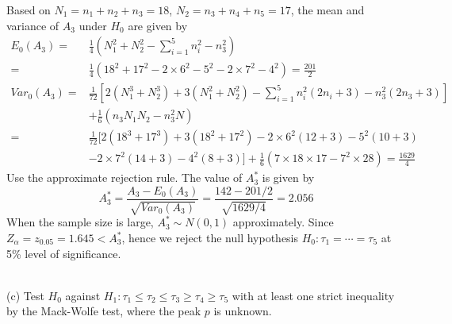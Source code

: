 \documentclass[12pt,a4paper]{article}
\begin{document}
Based on $N_{1}=n_{1}+n_{2}+n_{3}=18$, $N_{2}=n_{3}+n_{4}+n_{5}=17$, the mean and variance of $A_{3}$ under $H_{0}$ are given by
\begin{align*}
E_{0}(A_{3})=&\frac{1}{4}\left(N_{1}^{2}+N_{2}^{2}-\sum_{i=1}^{5}n_{i}^{2}-n_{3}^{2}\right)\\
=&\frac{1}{4}(18^{2}+17^{2}-2\times 6^{2}-5^{2}-2\times 7^{2}-4^{2})=\frac{201}{2}\\
Var_{0}(A_{3})=&\frac{1}{72}\left[2(N_{1}^{3}+N_{2}^{3})+3(N_{1}^{2}+N_{2}^{2})-\sum_{i=1}^{5}n_{i}^{2}(2n_{i}+3)-n_{3}^{2}(2n_{3}+3)\right]\\
&+\frac{1}{6}(n_{3}N_{1}N_{2}-n_{3}^{2}N)\\
=&\frac{1}{72}[2(18^{3}+17^{3})+3(18^{2}+17^{2})-2\times 6^{2}(12+3)-5^{2}(10+3)\\
&-2\times 7^{2}(14+3)-4^{2}(8+3)]+\frac{1}{6}(7\times 18\times 17-7^{2}\times 28)=\frac{1629}{4}
\end{align*}
Use the approximate rejection rule. The value of $A_{3}^{*}$ is given by
$$A_{3}^{*}=\frac{A_{3}-E_{0}(A_{3})}{\sqrt{Var_{0}(A_{3})}}=\frac{142-201/2}{\sqrt{1629/4}}=2.056$$
When the sample size is large, $A_{3}^{*}\sim N(0,1)$ approximately. Since $Z_{\alpha}=z_{0.05}=1.645<A_{3}^{*}$, hence we reject the null hypothesis $H_{0}:\tau_{1}=\cdots=\tau_{5}$ at 5\% level of significance.

~\\
(c) Test $H_{0}$ against $H_{1}:\tau_{1}\leqslant\tau_{2}\leqslant\tau_{3}\geqslant\tau_{4}\geqslant\tau_{5}$ with at least one strict inequality by the Mack-Wolfe test, where the peak $p$ is unknown.
\end{document}
